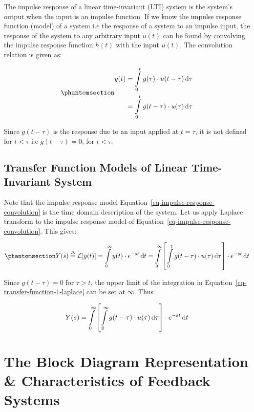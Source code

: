 \documentclass[
  14pt,
  a4paper,
  oneside,
  open=any,
  a4paper,
  14pt]{report}
\begin{document}
The impulse response of a linear time-invariant (LTI) system is the
system's output when the input is an impulse function. If we know the
impulse response function (model) of a system i.e the response of a
system to an impulse input, the response of the system to any arbitrary
input \(u(t)\) can be found by convolving the impulse response function
\(h(t)\) with the input \(u(t)\). The convolution relation is given as:

\begin{equation}\phantomsection\label{eq-impulse-response-convolution}{
\begin{aligned}
    y(t) &= \int\limits_{0}^{t} g(\tau)\cdot u(t-\tau) \odif{\tau} \\
    &= \int\limits_{0}^{t} g(t-\tau)\cdot u(\tau) \odif{\tau}
\end{aligned}
}\end{equation}

Since \(g(t - \tau)\) is the response due to an input applied at
\(t = \tau\), it is not defined for \(t < \tau\) i.e
\(g(t - \tau) = 0\), for \(t < \tau\).

\section{Transfer Function Models of Linear Time-Invariant
System}\label{transfer-function-models-of-linear-time-invariant-system}

Note that the impulse response model
Equation~\ref{eq-impulse-response-convolution} is the time domain
description of the system. Let us apply Laplace transform to the impulse
response model of Equation~\ref{eq-impulse-response-convolution}. This
gives:

\begin{equation}\phantomsection\label{eq-transfer-function-1-laplace}{
    Y(s) \overset{\Delta}{=} \mathcal{L}[y(t)] = \int\limits_{0}^{\infty} y(t) \cdot e^{-st} \odif{t} = \int\limits_{0}^{\infty} \left[ \int\limits_{0}^{t} g(t-\tau)\cdot u(\tau) \odif{\tau} \right] \cdot e^{-st} \odif{t}
}\end{equation}

Since \(g(t - \tau) = 0\) for \(\tau > t\), the upper limit of the
integration in Equation~\ref{eq-transfer-function-1-laplace} can be set
at \(\infty\). Thus

\[
    Y(s) = \int\limits_{0}^{\infty} \left[ \int\limits_{0}^{\infty} g(t-\tau)\cdot u(\tau) \odif{\tau} \right] \cdot e^{-st} \odif{t}
\]

\chapter{The Block Diagram Representation \& Characteristics of Feedback
Systems}\label{the-block-diagram-representation-characteristics-of-feedback-systems}
\end{document}
